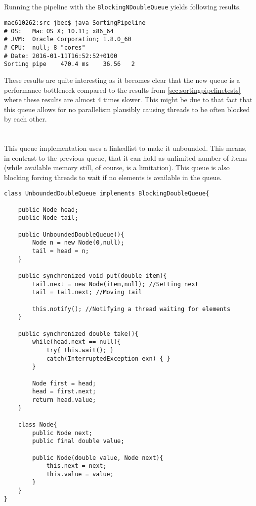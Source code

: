 \documentclass{ituhandin}
\begin{document}
\section{}
Running the pipeline with the \texttt{BlockingNDoubleQueue} yields following results.
\begin{lstlisting}[language={},frame={}]
mac610262:src jbec$ java SortingPipeline
# OS:   Mac OS X; 10.11; x86_64
# JVM:  Oracle Corporation; 1.8.0_60
# CPU:  null; 8 "cores"
# Date: 2016-01-11T16:52:52+0100
Sorting pipe    470.4 ms    36.56   2
\end{lstlisting}
These results are quite interesting as it becomes clear that the new queue is a performance bottleneck compared to the results from \ref{sec:sortingpipelinetests} where these results are almost 4 times slower. This might be due to that fact that this queue allows for no parallelism plausibly causing threads to be often blocked by each other.

\chapter{} %
\section{}
This queue implementation uses a linkedlist to make it unbounded. This means, in contrast to the previous queue, that it can hold as unlimited number of items (while available memory still, of course, is a limitation). This queue is also blocking forcing threads to wait if no elements is available in the queue.
\begin{lstlisting}[caption= Implementation of the \texttt{UnboundedDoubleQueue} blocking queue]
class UnboundedDoubleQueue implements BlockingDoubleQueue{

    public Node head;
    public Node tail;

    public UnboundedDoubleQueue(){
        Node n = new Node(0,null);
        tail = head = n;
    }

    public synchronized void put(double item){
        tail.next = new Node(item,null); //Setting next
        tail = tail.next; //Moving tail

        this.notify(); //Notifying a thread waiting for elements
    }

    public synchronized double take(){
        while(head.next == null){
            try{ this.wait(); }
            catch(InterruptedException exn) { }
        }

        Node first = head;
        head = first.next;
        return head.value;
    }

    class Node{
        public Node next;
        public final double value;

        public Node(double value, Node next){
            this.next = next;
            this.value = value;
        }
    }
}
\end{lstlisting}
\end{document}

